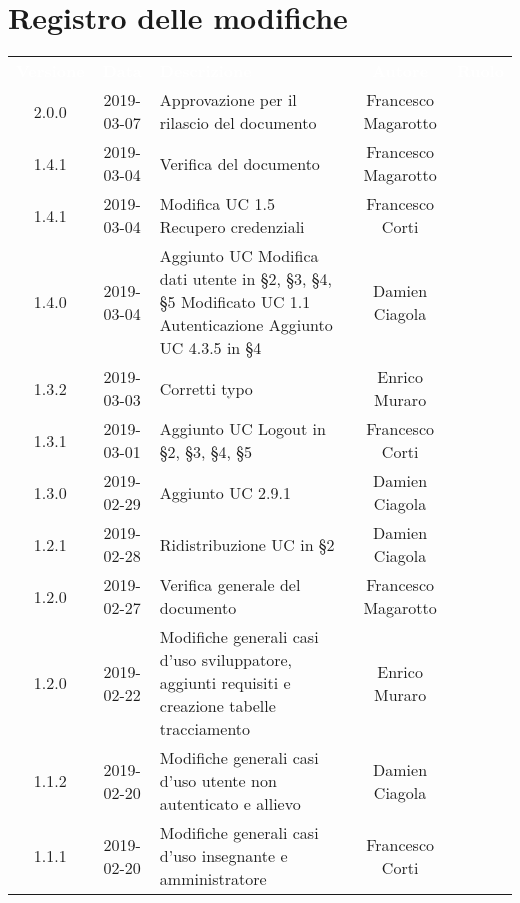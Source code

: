 \section*{Registro delle modifiche}
{
	\renewcommand{\arraystretch}{1.5}
	\centering
	\begin{longtable}{ c c C{6cm} c c }
		\textcolor{white}{\textbf{Versione}} & \textcolor{white}{\textbf{Data}} & \textcolor{white}{\textbf{Descrizione}} & \textcolor{white}{\textbf{Autore}} & \textcolor{white}{\textbf{Ruolo}}\\
		2.0.0 &
		2019-03-07 &
		Approvazione per il rilascio del documento &
		Francesco Magarotto &
		\Res{} \\
		1.4.1 &
		2019-03-04 &
		Verifica del documento &
		Francesco Magarotto &
		\ver{} \\
		1.4.1 &
		2019-03-04 &
		Modifica UC 1.5 Recupero credenziali &
		Francesco Corti &
		\reda{} \\
		1.4.0 & 
		2019-03-04 &
		Aggiunto UC Modifica dati utente in §2, §3, §4, §5 \newline Modificato UC 1.1 Autenticazione \newline Aggiunto UC 4.3.5 in §4 &
		Damien Ciagola &
		\reda{} \\
		1.3.2 & 
		2019-03-03 &
		Corretti typo &
		Enrico Muraro &
		\reda{} \\
		1.3.1 &
		2019-03-01 &
		Aggiunto UC Logout in §2, §3, §4, §5 &
		Francesco Corti &
		\reda{} \\
		1.3.0 &
		2019-02-29 &
		Aggiunto UC 2.9.1 &
		Damien Ciagola&
		\reda{} \\
		1.2.1 &
		2019-02-28 &
		Ridistribuzione UC in §2 &
		Damien Ciagola&
		\reda{} \\	
		
		1.2.0 & 
		2019-02-27 &  
		Verifica generale del documento & 	
		Francesco Magarotto  &	
		\ver{} \\
		
		1.2.0 &
		2019-02-22 &
		Modifiche generali casi d'uso sviluppatore, aggiunti requisiti e creazione tabelle tracciamento &
		Enrico Muraro&
		\reda{} \\	
		
		1.1.2 &
		2019-02-20 &
		Modifiche generali casi d'uso utente non autenticato e allievo&
		Damien Ciagola&
		\reda{} \\		
				
		1.1.1 &
		2019-02-20 &
		Modifiche generali casi d'uso insegnante e amministratore&
		Francesco Corti&
		\reda{} \\		
				

\end{longtable}}
